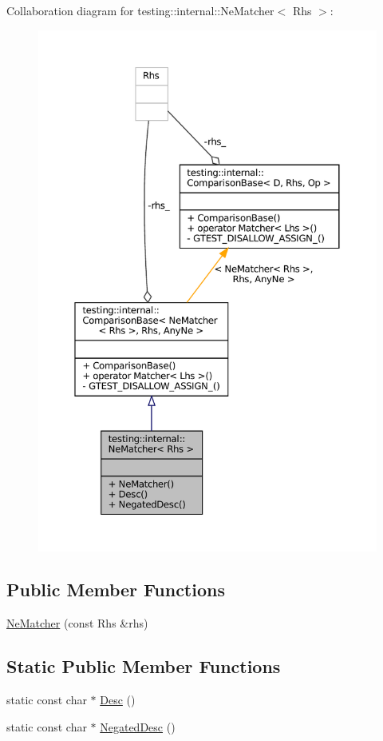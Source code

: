 Collaboration diagram for testing\+:\+:internal\+:\+:Ne\+Matcher$<$ Rhs $>$\+:
\nopagebreak
\begin{figure}[H]
\begin{center}
\leavevmode
\includegraphics[width=350pt]{classtesting_1_1internal_1_1NeMatcher__coll__graph}
\end{center}
\end{figure}
\subsection*{Public Member Functions}
\begin{DoxyCompactItemize}
\item 
\hyperlink{classtesting_1_1internal_1_1NeMatcher_a64842882811cc96624c87119c51edd3e}{Ne\+Matcher} (const Rhs \&rhs)
\end{DoxyCompactItemize}
\subsection*{Static Public Member Functions}
\begin{DoxyCompactItemize}
\item 
static const char $\ast$ \hyperlink{classtesting_1_1internal_1_1NeMatcher_a2ec33febe5471f9d435b4dc9f5cda564}{Desc} ()
\item 
static const char $\ast$ \hyperlink{classtesting_1_1internal_1_1NeMatcher_a9ea152391b69d422ba2a88c3d2d2dae5}{Negated\+Desc} ()
\end{DoxyCompactItemize}


